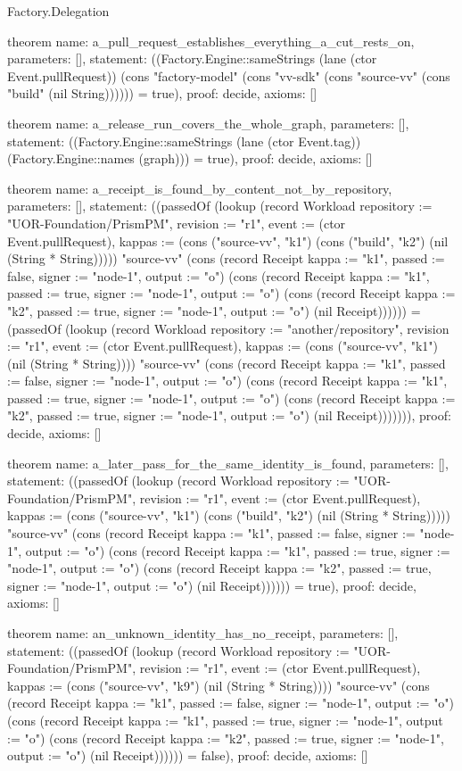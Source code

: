\begin{lexlean}{Factory.Delegation}
\begin{semanticmodule}
theorem{
  name: a_pull_request_establishes_everything_a_cut_rests_on,
  parameters: [],
  statement: ((Factory.Engine::sameStrings (lane (ctor Event.pullRequest)) (cons "factory-model" (cons "vv-sdk" (cons "source-vv" (cons "build" (nil String)))))) = true),
  proof: decide{},
  axioms: []
}

theorem{
  name: a_release_run_covers_the_whole_graph,
  parameters: [],
  statement: ((Factory.Engine::sameStrings (lane (ctor Event.tag)) (Factory.Engine::names (graph))) = true),
  proof: decide{},
  axioms: []
}

theorem{
  name: a_receipt_is_found_by_content_not_by_repository,
  parameters: [],
  statement: ((passedOf (lookup (record Workload {repository := "UOR-Foundation/PrismPM", revision := "r1", event := (ctor Event.pullRequest), kappas := (cons ("source-vv", "k1") (cons ("build", "k2") (nil (String * String))))}) "source-vv" (cons (record Receipt {kappa := "k1", passed := false, signer := "node-1", output := "o"}) (cons (record Receipt {kappa := "k1", passed := true, signer := "node-1", output := "o"}) (cons (record Receipt {kappa := "k2", passed := true, signer := "node-1", output := "o"}) (nil Receipt)))))) = (passedOf (lookup (record Workload {repository := "another/repository", revision := "r1", event := (ctor Event.pullRequest), kappas := (cons ("source-vv", "k1") (nil (String * String)))}) "source-vv" (cons (record Receipt {kappa := "k1", passed := false, signer := "node-1", output := "o"}) (cons (record Receipt {kappa := "k1", passed := true, signer := "node-1", output := "o"}) (cons (record Receipt {kappa := "k2", passed := true, signer := "node-1", output := "o"}) (nil Receipt))))))),
  proof: decide{},
  axioms: []
}

theorem{
  name: a_later_pass_for_the_same_identity_is_found,
  parameters: [],
  statement: ((passedOf (lookup (record Workload {repository := "UOR-Foundation/PrismPM", revision := "r1", event := (ctor Event.pullRequest), kappas := (cons ("source-vv", "k1") (cons ("build", "k2") (nil (String * String))))}) "source-vv" (cons (record Receipt {kappa := "k1", passed := false, signer := "node-1", output := "o"}) (cons (record Receipt {kappa := "k1", passed := true, signer := "node-1", output := "o"}) (cons (record Receipt {kappa := "k2", passed := true, signer := "node-1", output := "o"}) (nil Receipt)))))) = true),
  proof: decide{},
  axioms: []
}

theorem{
  name: an_unknown_identity_has_no_receipt,
  parameters: [],
  statement: ((passedOf (lookup (record Workload {repository := "UOR-Foundation/PrismPM", revision := "r1", event := (ctor Event.pullRequest), kappas := (cons ("source-vv", "k9") (nil (String * String)))}) "source-vv" (cons (record Receipt {kappa := "k1", passed := false, signer := "node-1", output := "o"}) (cons (record Receipt {kappa := "k1", passed := true, signer := "node-1", output := "o"}) (cons (record Receipt {kappa := "k2", passed := true, signer := "node-1", output := "o"}) (nil Receipt)))))) = false),
  proof: decide{},
  axioms: []
}


\end{semanticmodule}
\end{lexlean}
